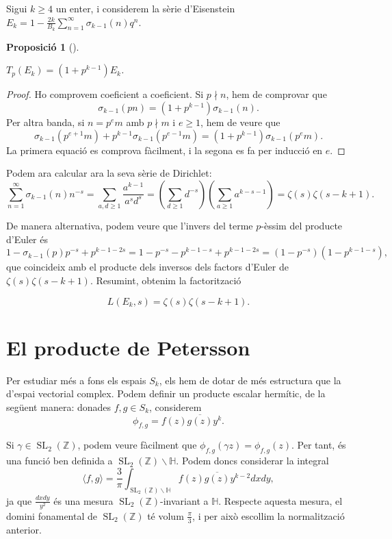 \documentclass[
  letterpaper,
  DIV=11,
  numbers=noendperiod]{scrreprt}
\theoremstyle{plain}
\theoremstyle{plain}
\theoremstyle{definition}
\theoremstyle{plain}
\newtheorem{proposition}{Proposició}[chapter]
\theoremstyle{plain}
\theoremstyle{definition}
\theoremstyle{remark}
\begin{document}
Sigui \(k\geq 4\) un enter, i considerem la sèrie d'Eisenstein
\(E_k = 1 - \frac{2k}{B_k}\sum_{n=1}^\infty \sigma_{k-1}(n)q^n\).

\begin{proposition}[]\protect\hypertarget{prp-}{}\label{prp-}

\(T_p(E_k) = (1+p^{k-1})E_k\).

\end{proposition}

\begin{proof}
Ho comprovem coeficient a coeficient. Si \(p\nmid n\), hem de comprovar
que \[
\sigma_{k-1}(pn) = (1+p^{k-1})\sigma_{k-1}(n).
\] Per altra banda, si \(n = p^em\) amb \(p\nmid m\) i \(e\geq 1\), hem
de veure que \[
\sigma_{k-1}(p^{e+1}m) + p^{k-1} \sigma_{k-1}(p^{e-1}m) = (1+p^{k-1})\sigma_{k-1}(p^em).
\] La primera equació es comprova fàcilment, i la segona es fa per
inducció en \(e\).
\end{proof}

Podem ara calcular ara la seva sèrie de Dirichlet: \[
\sum_{n=1}^\infty \sigma_{k-1}(n)n^{-s} = \sum_{a,d\geq 1} \frac{a^{k-1}}{a^sd^s} = \left(\sum_{d\geq 1} d^{-s}\right)\left(\sum_{a\geq 1} a^{k-s-1}\right) = \zeta(s)\zeta(s-k+1).
\]

De manera alternativa, podem veure que l'invers del terme \(p\)-èssim
del producte d'Euler és \[
1-\sigma_{k-1}(p)p^{-s} + p^{k-1-2s} = 1- p^{-s} - p^{k-1-s} + p^{k-1-2s} = (1-p^{-s})(1-p^{k-1-s}),
\] que coincideix amb el producte dels inversos dels factors d'Euler de
\(\zeta(s)\zeta(s-k+1)\). Resumint, obtenim la factorització

\[
L(E_k,s) = \zeta(s)\zeta(s-k+1).
\]

\section{El producte de Petersson}\label{el-producte-de-petersson}

Per estudiar més a fons els espais \(S_k\), els hem de dotar de més
estructura que la d'espai vectorial complex. Podem definir un producte
escalar hermític, de la següent manera: donades \(f,g\in S_k\),
considerem \[
\phi_{f,g} = f(z)\overline{g(z)} y^{k}.
\]

Si \(\gamma\in\operatorname{SL}_2(\mathbb{Z})\), podem veure fàcilment
que \(\phi_{f,g}(\gamma z) = \phi_{f,g}(z)\). Per tant, és una funció
ben definida a \(\operatorname{SL}_2(\mathbb{Z})\backslash\mathbb{H}\).
Podem doncs considerar la integral \[
\langle f,g\rangle = \frac{3}{\pi}\int_{\operatorname{SL}_2(\mathbb{Z})\backslash\mathbb{H}} f(z)\overline{g(z)} y^{k-2}dxdy,
\] ja que \(\frac{dxdy}{y^2}\) és una mesura
\(\operatorname{SL}_2(\mathbb{Z})\)-invariant a \(\mathbb{H}\). Respecte
aquesta mesura, el domini fonamental de
\(\operatorname{SL}_2(\mathbb{Z})\) té volum \(\frac{\pi}{3}\), i per
això escollim la normalització anterior.
\end{document}
